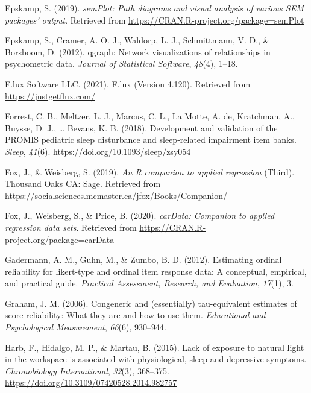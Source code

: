 \documentclass[
  english,
  man]{apa6}
\newlength{\cslhangindent}
\newlength{\cslentryspacingunit} %
\newenvironment{CSLReferences}[2] %
 {%
  \setlength{\parindent}{0pt}
  \ifodd #1
  \let\oldpar\par
  \def\par{\hangindent=\cslhangindent\oldpar}
  \fi
  \setlength{\parskip}{#2\cslentryspacingunit}
 }%
 {}
\begin{document}
\begin{CSLReferences}{1}{0}
\leavevmode{}%
Epskamp, S. (2019). \emph{semPlot: Path diagrams and visual analysis of various SEM packages' output}. Retrieved from \url{https://CRAN.R-project.org/package=semPlot}

\leavevmode{}%
Epskamp, S., Cramer, A. O. J., Waldorp, L. J., Schmittmann, V. D., \& Borsboom, D. (2012). {qgraph}: Network visualizations of relationships in psychometric data. \emph{Journal of Statistical Software}, \emph{48}(4), 1--18.

\leavevmode{}%
F.lux Software LLC. (2021). F.lux (Version 4.120). Retrieved from \url{https://justgetflux.com/}

\leavevmode{}%
Forrest, C. B., Meltzer, L. J., Marcus, C. L., La Motte, A. de, Kratchman, A., Buysse, D. J., \ldots{} Bevans, K. B. (2018). Development and validation of the PROMIS pediatric sleep disturbance and sleep-related impairment item banks. \emph{Sleep}, \emph{41}(6). \url{https://doi.org/10.1093/sleep/zsy054}

\leavevmode{}%
Fox, J., \& Weisberg, S. (2019). \emph{An {R} companion to applied regression} (Third). Thousand Oaks {CA}: Sage. Retrieved from \url{https://socialsciences.mcmaster.ca/jfox/Books/Companion/}

\leavevmode{}%
Fox, J., Weisberg, S., \& Price, B. (2020). \emph{carData: Companion to applied regression data sets}. Retrieved from \url{https://CRAN.R-project.org/package=carData}

\leavevmode{}%
Gadermann, A. M., Guhn, M., \& Zumbo, B. D. (2012). Estimating ordinal reliability for likert-type and ordinal item response data: A conceptual, empirical, and practical guide. \emph{Practical Assessment, Research, and Evaluation}, \emph{17}(1), 3.

\leavevmode{}%
Graham, J. M. (2006). Congeneric and (essentially) tau-equivalent estimates of score reliability: What they are and how to use them. \emph{Educational and Psychological Measurement}, \emph{66}(6), 930--944.

\leavevmode{}%
Harb, F., Hidalgo, M. P., \& Martau, B. (2015). Lack of exposure to natural light in the workspace is associated with physiological, sleep and depressive symptoms. \emph{Chronobiology International}, \emph{32}(3), 368--375. \url{https://doi.org/10.3109/07420528.2014.982757}


\end{CSLReferences}
\end{document}
